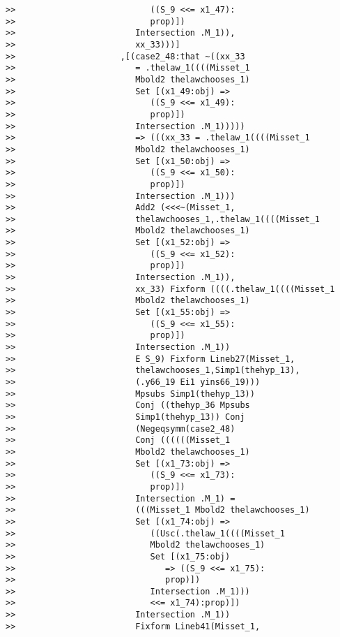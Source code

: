 \documentclass[12pt]{article}
\begin{document}
\begin{verbatim}
>>                           ((S_9 <<= x1_47):
>>                           prop)])
>>                        Intersection .M_1)),
>>                        xx_33)))]
>>                     ,[(case2_48:that ~((xx_33
>>                        = .thelaw_1((((Misset_1
>>                        Mbold2 thelawchooses_1)
>>                        Set [(x1_49:obj) =>
>>                           ((S_9 <<= x1_49):
>>                           prop)])
>>                        Intersection .M_1)))))
>>                        => (((xx_33 = .thelaw_1((((Misset_1
>>                        Mbold2 thelawchooses_1)
>>                        Set [(x1_50:obj) =>
>>                           ((S_9 <<= x1_50):
>>                           prop)])
>>                        Intersection .M_1)))
>>                        Add2 (<<<~(Misset_1,
>>                        thelawchooses_1,.thelaw_1((((Misset_1
>>                        Mbold2 thelawchooses_1)
>>                        Set [(x1_52:obj) =>
>>                           ((S_9 <<= x1_52):
>>                           prop)])
>>                        Intersection .M_1)),
>>                        xx_33) Fixform ((((.thelaw_1((((Misset_1
>>                        Mbold2 thelawchooses_1)
>>                        Set [(x1_55:obj) =>
>>                           ((S_9 <<= x1_55):
>>                           prop)])
>>                        Intersection .M_1))
>>                        E S_9) Fixform Lineb27(Misset_1,
>>                        thelawchooses_1,Simp1(thehyp_13),
>>                        (.y66_19 Ei1 yins66_19)))
>>                        Mpsubs Simp1(thehyp_13))
>>                        Conj ((thehyp_36 Mpsubs
>>                        Simp1(thehyp_13)) Conj
>>                        (Negeqsymm(case2_48)
>>                        Conj ((((((Misset_1
>>                        Mbold2 thelawchooses_1)
>>                        Set [(x1_73:obj) =>
>>                           ((S_9 <<= x1_73):
>>                           prop)])
>>                        Intersection .M_1) =
>>                        (((Misset_1 Mbold2 thelawchooses_1)
>>                        Set [(x1_74:obj) =>
>>                           ((Usc(.thelaw_1((((Misset_1
>>                           Mbold2 thelawchooses_1)
>>                           Set [(x1_75:obj)
>>                              => ((S_9 <<= x1_75):
>>                              prop)])
>>                           Intersection .M_1)))
>>                           <<= x1_74):prop)])
>>                        Intersection .M_1))
>>                        Fixform Lineb41(Misset_1,

\end{verbatim}
\end{document}
